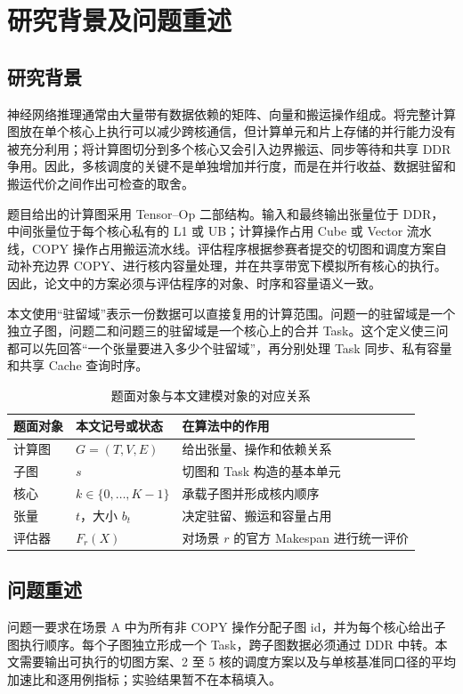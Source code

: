 \section{研究背景及问题重述}
\subsection{研究背景}
神经网络推理通常由大量带有数据依赖的矩阵、向量和搬运操作组成。将完整计算图放在单个核心上执行可以减少跨核通信，但计算单元和片上存储的并行能力没有被充分利用；将计算图切分到多个核心又会引入边界搬运、同步等待和共享 DDR 争用。因此，多核调度的关键不是单独增加并行度，而是在并行收益、数据驻留和搬运代价之间作出可检查的取舍。

题目给出的计算图采用 Tensor--Op 二部结构。输入和最终输出张量位于 DDR，中间张量位于每个核心私有的 L1 或 UB；计算操作占用 Cube 或 Vector 流水线，COPY 操作占用搬运流水线。评估程序根据参赛者提交的切图和调度方案自动补充边界 COPY、进行核内容量处理，并在共享带宽下模拟所有核心的执行。因此，论文中的方案必须与评估程序的对象、时序和容量语义一致。

本文使用“驻留域”表示一份数据可以直接复用的计算范围。问题一的驻留域是一个独立子图，问题二和问题三的驻留域是一个核心上的合并 Task。这个定义使三问都可以先回答“一个张量要进入多少个驻留域”，再分别处理 Task 同步、私有容量和共享 Cache 查询时序。
\begin{table}[H]\centering\caption{题面对象与本文建模对象的对应关系}
\begin{tabularx}{\linewidth}{lYY}\toprule
题面对象 & 本文记号或状态 & 在算法中的作用\\\midrule
计算图 & $G=(T,V,E)$ & 给出张量、操作和依赖关系\\
子图 & $s$ & 切图和 Task 构造的基本单元\\
核心 & $k\in\{0,\ldots,K-1\}$ & 承载子图并形成核内顺序\\
张量 & $t$，大小 $b_t$ & 决定驻留、搬运和容量占用\\
评估器 & $F_r(X)$ & 对场景 $r$ 的官方 Makespan 进行统一评价\\\bottomrule
\end{tabularx}\end{table}

\subsection{问题重述}
问题一要求在场景 A 中为所有非 COPY 操作分配子图 id，并为每个核心给出子图执行顺序。每个子图独立形成一个 Task，跨子图数据必须通过 DDR 中转。本文需要输出可执行的切图方案、2 至 5 核的调度方案以及与单核基准同口径的平均加速比和逐用例指标；实验结果暂不在本稿填入。

